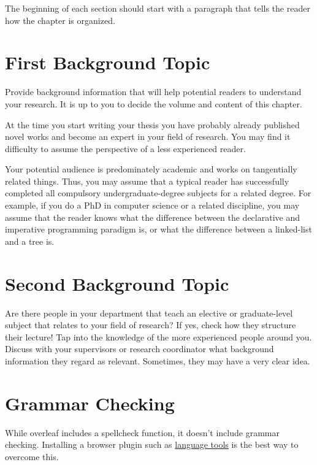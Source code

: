 
\noindent The beginning of each section should start with a paragraph that tells the reader how the chapter is organized.

\section{First Background Topic}
\label{s:First-Background-Topic}

Provide background information that will help potential readers to understand your research. It is up to you to decide the volume and content of this chapter.

At the time you start writing your thesis you have probably already published novel works and become an expert in your field of research. You may find it difficulty to assume the perspective of a less experienced reader.

Your potential audience is predominately academic and works on tangentially related things. Thus, you may assume that a typical reader has successfully completed all compulsory undergraduate-degree subjects for a related degree. For example, if you do a PhD in computer science or a related discipline, you may assume that the reader knows what the difference between the declarative and imperative programming paradigm is, or what the difference between a linked-list and a tree is.

\section{Second Background Topic}
\label{s:Second-Background-Topic}

Are there people in your department that teach an elective or graduate-level subject that relates to your field of research? If yes, check how they structure their lecture! Tap into the knowledge of the more experienced people around you. Discuss with your supervisors or research coordinator what background information they regard as relevant. Sometimes, they may have a very clear idea.

\section{Grammar Checking}
While overleaf includes a spellcheck function, it doesn't include grammar checking. Installing a browser plugin such as \href{https://www.overleaf.com/blog/635-languagetool-a-free-browser-add-on-to-check-your-grammar-and-spelling}{language tools}
 is the best way to overcome this. 
